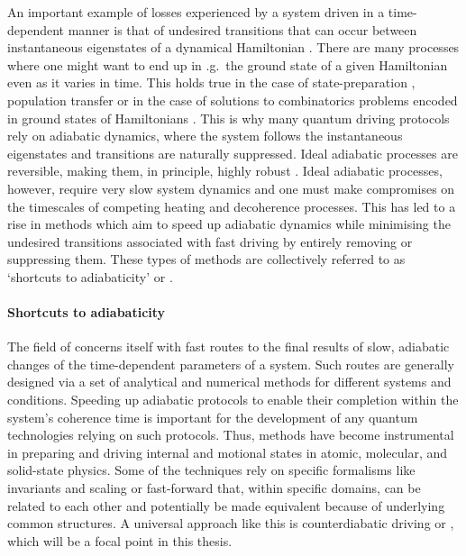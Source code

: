 An important example of losses experienced by a system driven in a time-dependent manner is that of undesired transitions that can occur between instantaneous eigenstates of a dynamical Hamiltonian \cite{berry_transitionless_2009, kolodrubetz_geometry_2017}. There are many processes where one might want to end up in \@e.g.~the ground state of a given Hamiltonian even as it varies in time. This holds true in the case of state-preparation \cite{dimitrova_many-body_2023}, population transfer \cite{meier_counterdiabatic_2020} or in the case of solutions to combinatorics problems encoded in ground states of Hamiltonians \cite{pichler_quantum_2018, ebadi_quantum_2022}. This is why many quantum driving protocols rely on adiabatic dynamics, where the system follows the instantaneous eigenstates and transitions are naturally suppressed\cite{born_beweis_1928, kato_adiabatic_1950}. Ideal adiabatic processes are reversible, making them, in principle, highly robust \cite{jarzynski_geometric_1995, kolodrubetz_geometry_2017}. Ideal adiabatic processes, however, require very slow system dynamics and one must make compromises on the timescales of competing heating and decoherence processes. This has led to a rise in methods which aim to speed up adiabatic dynamics while minimising the undesired transitions associated with fast driving by entirely removing or suppressing them. These types of methods are collectively referred to as `shortcuts to adiabaticity' or  \cite{guery-odelin_shortcuts_2019, torrontegui_chapter_2013}. 

\paragraph*{Shortcuts to adiabaticity} 

The field of  concerns itself with fast routes to the final results of slow, adiabatic changes of the time-dependent parameters of a system. Such routes are generally designed via a set of analytical and numerical methods for different systems and conditions. Speeding up adiabatic protocols to enable their completion within the system’s coherence time is important
for the development of any quantum technologies relying on such protocols. Thus,  methods have become instrumental in preparing and driving internal and motional states in atomic, molecular, and solid-state physics. Some of the  techniques rely on specific formalisms like invariants and scaling \cite{deffner_classical_2014, deng_superadiabatic_2018, chen_fast_2010} or fast-forward \cite{masuda_fast-forward_2009, masuda_fast-forward_2008} that, within specific domains, can be related to each other and potentially be made equivalent because of underlying common structures. A universal  approach like this is counterdiabatic driving or , which will be a focal point in this thesis. 

